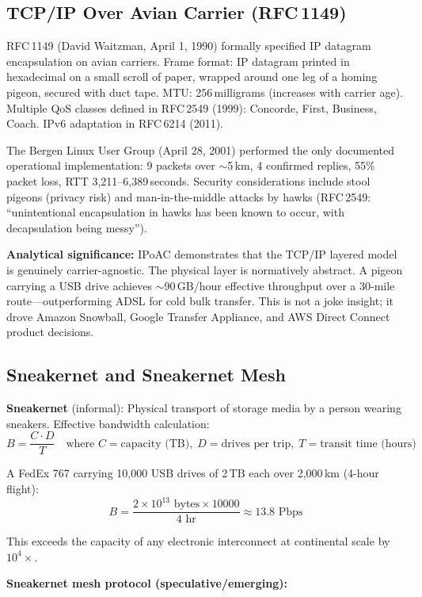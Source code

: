 \documentclass[11pt,letterpaper]{article}
\begin{document}
\subsection{TCP/IP Over Avian Carrier (RFC\,1149)}

RFC\,1149 (David Waitzman, April 1, 1990) formally specified IP datagram encapsulation on avian carriers. Frame format: IP datagram printed in hexadecimal on a small scroll of paper, wrapped around one leg of a homing pigeon, secured with duct tape. MTU: 256\,milligrams (increases with carrier age). Multiple QoS classes defined in RFC\,2549 (1999): Concorde, First, Business, Coach. IPv6 adaptation in RFC\,6214 (2011).

The Bergen Linux User Group (April 28, 2001) performed the only documented operational implementation: 9 packets over $\sim$5\,km, 4 confirmed replies, 55\% packet loss, RTT 3,211--6,389\,seconds. Security considerations include stool pigeons (privacy risk) and man-in-the-middle attacks by hawks (RFC\,2549: ``unintentional encapsulation in hawks has been known to occur, with decapsulation being messy'').

\textbf{Analytical significance:} IPoAC demonstrates that the TCP/IP layered model is genuinely carrier-agnostic. The physical layer is normatively abstract. A pigeon carrying a USB drive achieves $\sim$90\,GB/hour effective throughput over a 30-mile route---outperforming ADSL for cold bulk transfer. This is not a joke insight; it drove Amazon Snowball, Google Transfer Appliance, and AWS Direct Connect product decisions.

\subsection{Sneakernet and Sneakernet Mesh}

\textbf{Sneakernet} (informal): Physical transport of storage media by a person wearing sneakers. Effective bandwidth calculation:
$$B = \frac{C \cdot D}{T} \quad\text{where } C = \text{capacity (TB)},\; D = \text{drives per trip},\; T = \text{transit time (hours)}$$

A FedEx 767 carrying 10,000 USB drives of 2\,TB each over 2,000\,km (4-hour flight):
$$B = \frac{2 \times 10^{13} \text{ bytes} \times 10000}{4 \text{ hr}} \approx 13.8 \text{ Pbps}$$

This exceeds the capacity of any electronic interconnect at continental scale by $10^4\times$.

\textbf{Sneakernet mesh protocol (speculative/emerging):}
\end{document}
